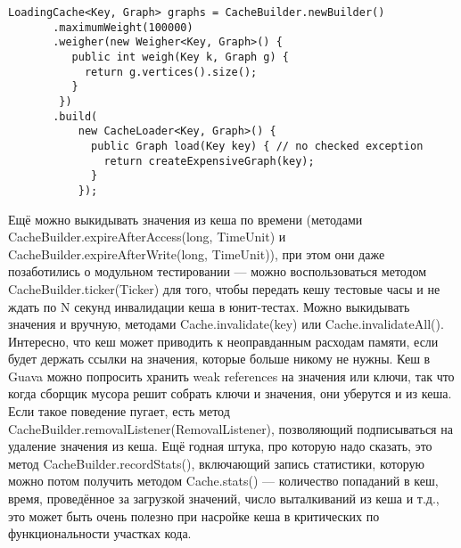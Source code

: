 \documentclass[a5paper,draft]{article}
\begin{document}
\begin{verbatim}
LoadingCache<Key, Graph> graphs = CacheBuilder.newBuilder()
       .maximumWeight(100000)
       .weigher(new Weigher<Key, Graph>() {
          public int weigh(Key k, Graph g) {
            return g.vertices().size();
          }
        })
       .build(
           new CacheLoader<Key, Graph>() {
             public Graph load(Key key) { // no checked exception
               return createExpensiveGraph(key);
             }
           });
\end{verbatim}

Ещё можно выкидывать значения из кеша по времени (методами CacheBuilder.expireAfterAccess(long, TimeUnit) и CacheBuilder.expireAfterWrite(long, TimeUnit)), при этом они даже позаботились о модульном тестировании --- можно воспользоваться методом CacheBuilder.ticker(Ticker) для того, чтобы передать кешу тестовые часы и не ждать по N секунд инвалидации кеша в юнит-тестах. Можно выкидывать значения и вручную, методами Cache.invalidate(key) или Cache.invalidateAll(). Интересно, что кеш может приводить к неоправданным расходам памяти, если будет держать ссылки на значения, которые больше никому не нужны. Кеш в Guava можно попросить хранить weak references на значения или ключи, так что когда сборщик мусора решит собрать ключи и значения, они уберутся и из кеша. Если такое поведение пугает, есть метод CacheBuilder.removalListener(RemovalListener), позволяющий подписываться на удаление значения из кеша. Ещё годная штука, про которую надо сказать, это метод CacheBuilder.recordStats(), включающий запись статистики, которую можно потом получить методом Cache.stats() --- количество попаданий в кеш, время, проведённое за загрузкой значений, число выталкиваний из кеша и т.д., это может быть очень полезно при насройке кеша в критических по функциональности участках кода.
\end{document}
